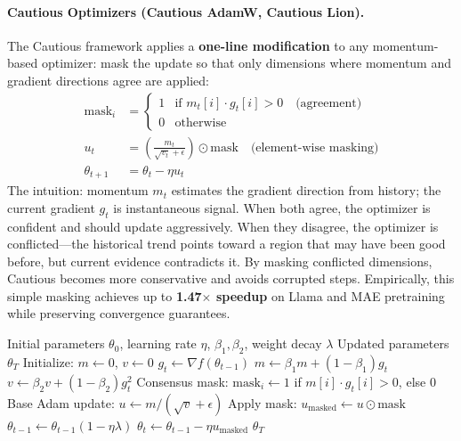 \documentclass[11pt,a4paper]{article}
\begin{document}
\paragraph{Cautious Optimizers (Cautious AdamW, Cautious Lion).}
The Cautious framework applies a \textbf{one-line modification} to any momentum-based optimizer: mask the update so that only dimensions where momentum and gradient directions agree are applied:
\begin{align}
\text{mask}_i &= \begin{cases} 1 & \text{if } m_t[i] \cdot g_t[i] > 0 \quad\text{(agreement)} \\ 0 & \text{otherwise} \end{cases} \\
u_t &= \left(\frac{m_t}{\sqrt{v_t}+\epsilon}\right) \odot \text{mask} \quad\text{(element-wise masking)} \\
\theta_{t+1} &= \theta_t - \eta u_t
\end{align}
The intuition: momentum $m_t$ estimates the gradient direction from history; the current gradient $g_t$ is instantaneous signal. When both agree, the optimizer is confident and should update aggressively. When they disagree, the optimizer is conflicted---the historical trend points toward a region that may have been good before, but current evidence contradicts it. By masking conflicted dimensions, Cautious becomes more conservative and avoids corrupted steps. Empirically, this simple masking achieves up to \textbf{1.47$\times$ speedup} on Llama and MAE pretraining while preserving convergence guarantees.

\begin{algorithm}[H]
\caption{Cautious AdamW (Consensus-based Update Masking)}
\label{alg:cautious}
\begin{algorithmic}[1]
\Require Initial parameters $\theta_0$, learning rate $\eta$, $\beta_1, \beta_2$, weight decay $\lambda$
\Ensure Updated parameters $\theta_T$
\State Initialize: $m \gets 0$, $v \gets 0$
    \State $g_t \gets \nabla f(\theta_{t-1})$
    \State $m \gets \beta_1 m + (1-\beta_1) g_t$
    \State $v \gets \beta_2 v + (1-\beta_2) g_t^2$
    \State Consensus mask: $\text{mask}_i \gets 1$ if $m[i] \cdot g_t[i] > 0$, else $0$ 
    \State Base Adam update: $u \gets m / (\sqrt{v} + \epsilon)$
    \State Apply mask: $u_{\text{masked}} \gets u \odot \text{mask}$ 
        \State $\theta_{t-1} \gets \theta_{t-1}(1 - \eta\lambda)$
    \EndIf
    \State $\theta_t \gets \theta_{t-1} - \eta u_{\text{masked}}$
\EndFor
\Return $\theta_T$
\end{algorithmic}
\end{algorithm}
\end{document}
